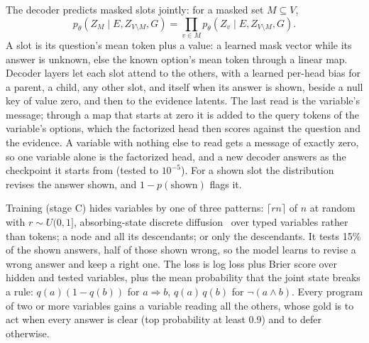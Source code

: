 The decoder predicts masked slots jointly: for a masked set $M \subseteq V$,
\begin{equation}
  p_\theta(Z_M \mid E, Z_{V\setminus M}, G) = \prod_{v \in M}
  p_\theta(Z_v \mid E, Z_{V\setminus M}, G).
\end{equation}
A slot is its question's mean token plus a value: a learned mask vector while
its answer is unknown, else the known option's mean token through a linear map.
Decoder layers let each slot attend to the others, with a learned per-head bias
for a parent, a child, any other slot, and itself when its answer is shown,
beside a null key of value zero, and then to the evidence latents. The last
read is the variable's message; through a map that starts at zero it is added
to the query tokens of the variable's options, which the factorized head then
scores against the question and the evidence. A variable with nothing else to
read gets a message of exactly zero, so one variable alone is the factorized
head, and a new decoder answers as the checkpoint it starts from (tested to
$10^{-5}$). For a shown slot the distribution revises the answer shown, and
$1 - p(\text{shown})$ flags it.

Training (stage C) hides variables by one of three patterns: $\lceil r n\rceil$
of $n$ at random with $r \sim U(0, 1]$, absorbing-state discrete
diffusion~\cite{austin2021d3pm} over typed variables rather than tokens; a node
and all its descendants; or only the descendants. It tests 15\% of the shown
answers, half of those shown wrong, so the model learns to revise a wrong
answer and keep a right one. The loss is log loss plus Brier score over hidden
and tested variables, plus the mean probability that the joint state breaks a
rule: $q(a)(1 - q(b))$ for $a \Rightarrow b$, $q(a)\,q(b)$ for
$\lnot(a \land b)$. Every program of two or more variables gains a 
variable reading all the others, whose gold is to act when every answer is
clear (top probability at least 0.9) and to defer otherwise.

